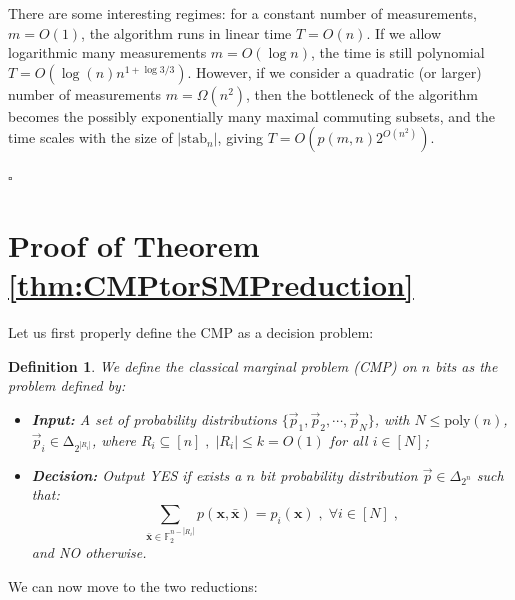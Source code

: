 \documentclass[10pt,aps,pra,twocolumn,floatfix,nofootinbib,superscriptaddress,longbibliography]{revtex4-2}
\newcommand{\1}{\mathbbm{1}}
\newtheorem{defn}{Definition}
\begin{document}
There are some interesting regimes: for a constant number of measurements, $m=O(1)$, the algorithm runs in linear time $T=O(n)$. If we allow logarithmic many measurements $m=O(\log{n})$, the time is still polynomial $T=O(\log(n)n^{1+\log 3/3})$. However, if we consider a quadratic (or larger) number of measurements $m=\Omega (n^2)$, then the bottleneck of the algorithm becomes the possibly exponentially many maximal commuting subsets, and the time scales with the size of $|\mathrm {stab}_n |$, giving $T=O(p(m,n)2^{O(n^2)})$.

$\square$
\section{Proof of Theorem \ref{thm:CMPtorSMPreduction} \label{proof:CMPtorSMPreduction}}
Let us first properly define the CMP as a decision problem:
\begin{defn}
    We define the classical marginal problem (CMP) on $n$ bits as the problem defined by:
    \begin{itemize}
        \item \textbf{Input: }A set of probability distributions $\{\vec{p}_{1}, \vec{p}_{2},\cdots, \vec{p}_{N}\}$, with $N \leq \mathrm{poly}(n)$, $\vec p_{i} \in \mathrm{\Delta}_{2^{|R_i|}}$, 
        where $R_i \subseteq[n]\;,\; |R_i| \leq k=O(1)$ for all $i \in [N]$;
        \item \textbf{Decision: }Output YES if exists a $n$ bit probability distribution $\vec{p} \in \Delta_{2^n}$ such that:
        \begin{equation}
            \sum_{\bar{\mathbf x} \in \mathbb F_2^{n-|R_i|}}p(\mathbf x, \bar{\mathbf x}) = p_i(\mathbf x)\;,\;\forall i \in [N]\;,
        \end{equation}
        and NO otherwise.
    \end{itemize}
    \label{def:classmargprob}
\end{defn}
We can now move to the two reductions:
\end{document}
